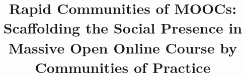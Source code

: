 \documentclass[manuscript,screen,review]{acmart}
\begin{document}
\title{Rapid Communities of MOOCs: Scaffolding the Social Presence in Massive Open Online Course by Communities of Practice }









\renewcommand{\shortauthors}{Trovato and Tobin, et al.}
\end{document}
